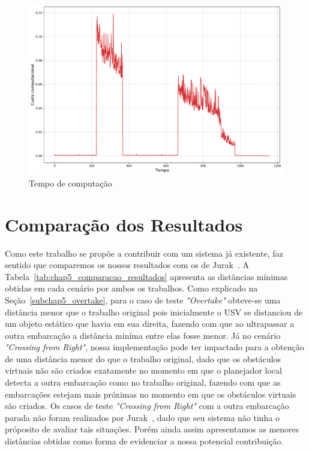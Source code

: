             \begin{figure}[H]
                \centering
                \includegraphics[width=\textwidth]{fig/chap5/crossing_right_stopped_vessel_cpa_computation_time.pdf}
                \caption{Tempo de computação}
                \label{fig:chap5_crossing_right_stopped_vessel_cpa_computation_time}
            \end{figure}
            
    \section{Comparação dos Resultados}
        Como este trabalho se propõe a contribuir com um sistema já existente, faz sentido que comparemos os nossos resultados com os de Jurak~\cite{Jurak2020COLREGS}. A Tabela~\ref{tab:chap5_comparacao_resultados} apresenta as distâncias mínimas obtidas em cada cenário por ambos os trabalhos. Como explicado na Seção~\ref{subchap5_overtake}, para o caso de teste \textit{"Overtake"} obteve-se uma distância menor que o trabalho original pois inicialmente o USV se distanciou de um objeto estático que havia em sua direita, fazendo com que ao ultrapassar a outra embarcação a distância miníma entre elas fosse menor. 
        Já no cenário \textit{"Crossing from Right"}, nossa implementação pode ter impactado para a obtenção de uma distância menor do que o trabalho original, dado que os obstáculos virtuais não são criados exatamente no momento em que o planejador local detecta a outra embarcação como no trabalho original, fazendo com que as embarcações estejam mais próximas no momento em que os obstáculos virtuais são criados. Os casos de teste \textit{"Crossing from Right"} com a outra embarcação parada não foram realizados por Jurak~\cite{Jurak2020COLREGS}, dado que seu sistema 
        não tinha o próposito de avaliar tais situações. Porém ainda assim apresentamos as menores distâncias obtidas como forma de evidenciar a nossa potencial contribuição.
        
